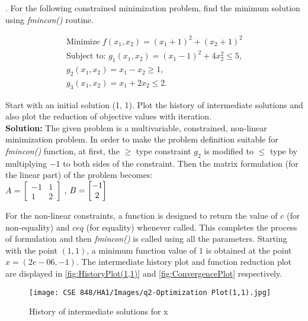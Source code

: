 \documentclass{article}
\begin{document}
. For the following constrained minimization problem, find the minimum solution using \emph{fmincon()} routine.

\begin{align*}
        \textrm{Minimize } f(x_1,x_2) = (x_1+1)^2 +(x_2+1)^2 \\
        \textrm{Subject to: }   g_1(x_1, x_2) = (x_1-1)^2 + 4x_2^2 \leq 5,\\
                                g_2(x_1, x_2) = x_1-x_2 \geq 1,\\ 
                                g_3(x_1, x_2) = x_1 + 2x_2 \leq 2.
\end{align*}

Start with an initial solution (1, 1). Plot the history of intermediate solutions and also plot the reduction of objective values with iteration.\\

\textbf{Solution:} 
The given problem is a multivariable, constrained, non-linear minimization problem. In order to make the problem definition suitable for \textit{fmincon()} function, at first, the $\geq$ type constraint $g_2$ is modified to $\leq$ type by multiplying $-1$ to both sides of the constraint. Then the matrix formulation (for the linear part) of the problem becomes:\\

$A = \begin{bmatrix}-1 & 1\\ 1 & 2\end{bmatrix}$
, $B = \begin{bmatrix}-1\\ 2\\ \end{bmatrix}\\$

For the non-linear constraints, a function is designed to return the value of $c$ (for non-equality) and $ceq$ (for equality) whenever called. This completes the process of formulation and then \textit{fmincon()} is called using all the parameters. Starting with the point $(1,1)$, a minimum function value of $1$ is obtained at the point $x=(2e-06, -1)$. The intermediate history plot and function reduction plot are displayed in \autoref{fig:HistoryPlot(1,1)} and \autoref{fig:ConvergencePlot} respectively.

\begin{figure}[H]
    \centering
    \texttt{[image: CSE 848/HA1/Images/q2-Optimization Plot(1,1).jpg]}
    \caption{History of intermediate solutions for x} 
    \label{fig:HistoryPlot(1,1)}
\end{figure}
\end{document}
